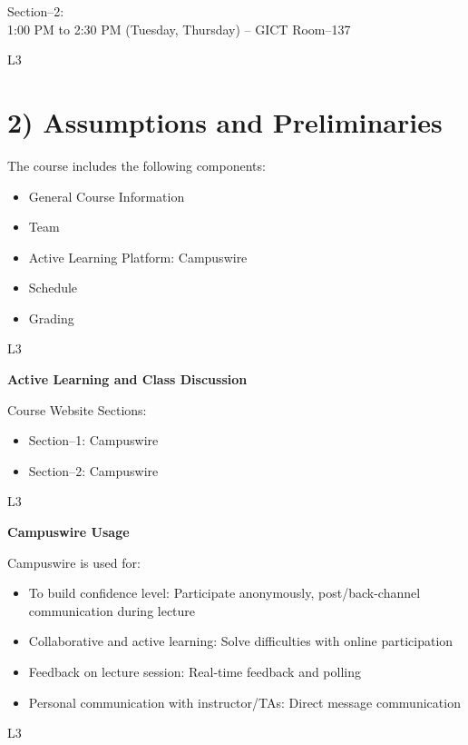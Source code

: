 \documentclass[12pt]{article}
\begin{document}
Section--2:\\
1:00 PM to 2:30 PM (Tuesday, Thursday) -- GICT Room--137

L3


\section*{2) Assumptions and Preliminaries}

The course includes the following components:

\begin{itemize}
    \item General Course Information
    \item Team
    \item Active Learning Platform: Campuswire
    \item Schedule
    \item Grading
\end{itemize}

L3

\vspace{0.3cm}

\textbf{Active Learning and Class Discussion}

Course Website Sections:

\begin{itemize}
    \item Section--1: Campuswire
    \item Section--2: Campuswire
\end{itemize}

L3

\vspace{0.3cm}

\textbf{Campuswire Usage}

Campuswire is used for:

\begin{itemize}
    \item To build confidence level: Participate anonymously, post/back-channel communication during lecture
    \item Collaborative and active learning: Solve difficulties with online participation
    \item Feedback on lecture session: Real-time feedback and polling
    \item Personal communication with instructor/TAs: Direct message communication
\end{itemize}

L3

\vspace{0.3cm}
\end{document}
